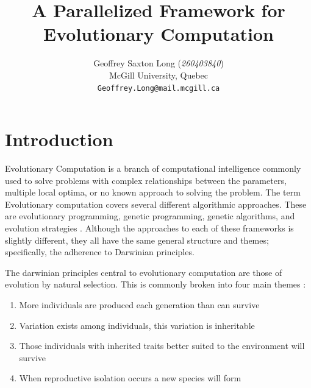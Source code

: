 \documentclass[10pt,letterpaper]{article}
\begin{document}
\title{A Parallelized Framework for Evolutionary Computation}

\author{
	Geoffrey Saxton Long (\textit{260403840})\\
	McGill University, Quebec \\
	{\tt\small Geoffrey.Long@mail.mcgill.ca}
}

\maketitle



\newpage
\section{Introduction}
Evolutionary Computation is a branch of computational intelligence commonly used to solve problems with complex relationships between the parameters, multiple local optima, or no known approach to solving the problem. The term Evolutionary computation covers several different algorithmic approaches. These are evolutionary programming, genetic programming, genetic algorithms, and evolution strategies \cite{ecomp}. Although the approaches to each of these frameworks is slightly different, they all have the same general structure and themes; specifically, the adherence to Darwinian principles.

The darwinian principles central to evolutionary computation are those of evolution by natural selection. This is commonly broken into four main themes \cite{naturalselection,naturalselection2}:
\begin{enumerate}
\item More individuals are produced each generation than can survive
\item Variation exists among individuals, this variation is inheritable
\item Those individuals with inherited traits better suited to the environment will survive
\item When reproductive isolation occurs a new species will form
\end{enumerate}
\end{document}
